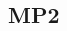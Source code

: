 \documentclass[journal=jctcce,manuscript=article]{achemso}
\begin{document}
\begin{spacing}{1}

\subsection{MP2}


\end{spacing}
\end{document}
